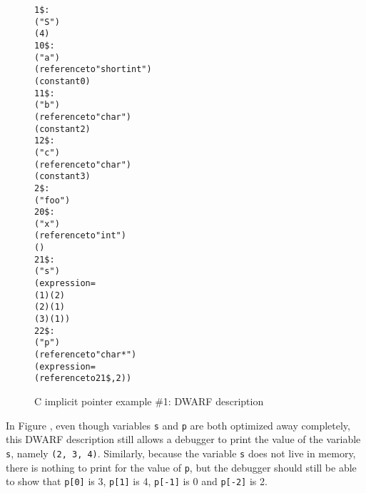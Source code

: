 \begin{figure}[h]
\begin{dwflisting}
\begin{alltt}
1\$: \DWTAGstructuretype
        \DWATname("S")
        \DWATbytesize(4)
10\$:    \DWTAGmember
            \DWATname("a")
            \DWATtype(reference to "short int")
            \DWATdatamemberlocation(constant 0)
11\$:    \DWTAGmember
            \DWATname("b")
            \DWATtype(reference to "char")
            \DWATdatamemberlocation(constant 2)
12\$:    \DWTAGmember
            \DWATname("c")
            \DWATtype(reference to "char")
            \DWATdatamemberlocation(constant 3)
2\$: \DWTAGsubprogram
        \DWATname("foo")
20\$:    \DWTAGformalparameter
            \DWATname("x")
            \DWATtype(reference to "int")
            \DWATlocation(\DWOPregfive)
21\$:    \DWTAGvariable
            \DWATname("s")
            \DWATlocation(expression=
                \DWOPbregfive(1) \DWOPstackvalue \DWOPpiece(2)
                \DWOPbregfive(2) \DWOPstackvalue \DWOPpiece(1)
                \DWOPbregfive(3) \DWOPstackvalue \DWOPpiece(1))
22\$:    \DWTAGvariable
            \DWATname("p")
            \DWATtype(reference to "char *")
            \DWATlocation(expression=
            \DWOPimplicitpointer(reference to 21\$, 2))
\end{alltt}
\end{dwflisting}
\caption{C implicit pointer example \#1: DWARF description}
\label{fig:cimplicitpointerexample1dwarf}
\end{figure}

In Figure ,
even though variables \texttt{s} and \texttt{p} are both optimized 
away completely, this DWARF description still allows a debugger to 
print the value of the variable \texttt{s}, namely \texttt{(2, 3, 4)}. 
Similarly, because the variable \texttt{s} does not live in
memory, there is nothing to print for the value of \texttt{p}, but the 
debugger should still be able to show that \texttt{p[0]} is 3, 
\texttt{p[1]} is 4, \texttt{p[-1]} is 0 and \texttt{p[-2]} is 2.

